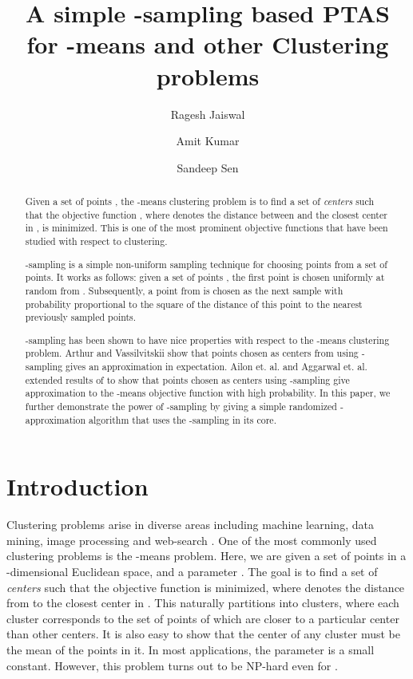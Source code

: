 \documentclass[a4paper]{article}
\title{A simple -sampling based PTAS for -means and other Clustering problems}
\author[1]{Ragesh Jaiswal}
\author[1]{Amit Kumar}
\author[1]{Sandeep Sen} \affil[1]{Department of Computer Science and Engineering \\ IIT Delhi\\ \texttt{\{rjaiswal,amitk,ssen\}@cse.iitd.ac.in}}
\begin{document}
\maketitle

\begin{abstract}
Given a set of points , the -means clustering problem is to find a set of  {\em centers}  such that the  objective function , where  denotes the distance between  and the closest center in , is
minimized. This is one of the most prominent objective functions that have been studied with respect to clustering.

-sampling \cite{ArthurV07} is a simple non-uniform sampling technique for choosing points from a set of points. It works as follows: given a set of points , the first point is chosen uniformly at random from . Subsequently, a point from  is chosen as the next sample with probability proportional to the square of the distance of this point to the nearest previously sampled points.

-sampling has been shown to have nice properties with respect to the -means clustering problem. Arthur and Vassilvitskii \cite{ArthurV07} show that  points chosen as centers from  using -sampling gives an  approximation in expectation. Ailon et. al. \cite{AJMonteleoni09} and Aggarwal et. al. \cite{AggarwalDK09} extended results of \cite{ArthurV07} to show that  points chosen as centers using -sampling give  approximation to the -means objective function with high probability. In this paper, we further demonstrate the power of -sampling by giving a simple randomized -approximation algorithm that uses
the -sampling in its core.
\end{abstract}


\section{Introduction}
Clustering problems arise in diverse areas including  machine learning, data mining, image processing and
web-search \cite{broder97,faloutsos,deer90,Swain}.
One of the most commonly used clustering problems is the -means problem. Here,
we are given a set of points  in a -dimensional Euclidean space, and a parameter . The goal is
to find a set  of  {\em centers} such that the objective function  is minimized,
where  denotes the distance from  to the closest center in . This naturally partitions  into
 clusters, where each cluster corresponds to the set of points of  which are closer to a particular center
than other centers. It is also easy to show that the center of any cluster must be  the mean of the
points in it.
 In most applications, the parameter  is a small constant. However, this problem turns out to be
 NP-hard even for  \cite{das08}.
\end{document}
